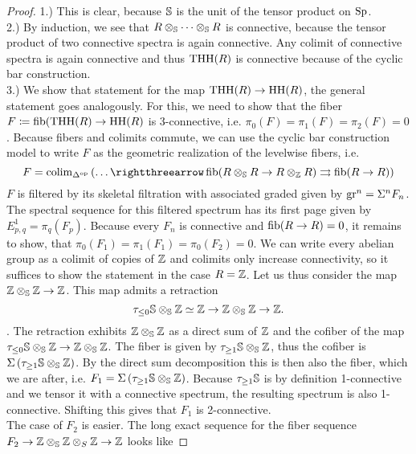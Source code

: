 \begin{proof}
    1.) This is clear, because $\S$ is the unit of the tensor product on $\Sp$. \\
    2.) By induction, we see that $R\otimes_\S\dots\otimes_\S R$ is connective, because the tensor product of two connective spectra is again connective. Any colimit of connective spectra is again connective and thus $\THH(R)$ is connective because of the cyclic bar construction. \\
    3.) We show that statement for the map $\THH(R)\to \HH(R)$, the general statement goes analogously.
    For this, we need to show that the fiber $F\coloneqq \fib(\THH(R)\to \HH(R)$ is 3-connective, i.e. $\pi_0(F)=\pi_1(F)=\pi_2(F)=0$. Because fibers and colimits commute, we can use the cyclic bar construction model to write $F$ as the geometric realization of the levelwise fibers, i.e.
    \begin{equation*}
        F=\colim_{\Delta^{\op}} \left( \dots\rightthreearrow \fib(R\otimes_\S R\to R\otimes_\Z R) \rightrightarrows \fib(R\to R) \right)
    \end{equation*}
    $F$ is filtered by its skeletal filtration with associated graded given by $\gr^n=\Sigma^n F_n$. The spectral sequence for this filtered spectrum has its first page given by $E^1_{p,q}=\pi_q(F_p)$. Because every $F_n$ is connective and $\fib(R\to R)=0$, it remains to show, that $\pi_0(F_1)=\pi_1(F_1)=\pi_0(F_2)=0$. We can write every abelian group as a colimit of copies of $\Z$ and colimits only increase connectivity, so it suffices to show the statement in the case $R=\Z$. Let us thus consider the map $\Z\otimes_\S \Z\to \Z$. This map admits a retraction 
    \begin{equation*}
        \tau_{\leq 0}\S\otimes_\S\Z\simeq \Z\to \Z\otimes_\S \Z\to \Z.
    \end{equation*}.
    The retraction exhibits $\Z\otimes_\S\Z$ as a direct sum of $\Z$ and the cofiber of the map $\tau_{\leq 0}\S\otimes_\S\Z\to \Z\otimes_\S\Z$. The fiber is given by $\tau_{\geq 1}\S\otimes_\S\Z$, thus the cofiber is $\Sigma\left( \tau_{\geq 1}\S\otimes_\S\Z \right)$. By the direct sum decomposition this is then also the fiber, which we are after, i.e. $F_1=\Sigma\left( \tau_{\geq 1}\S\otimes_\S\Z \right)$. Because $\tau_{\geq 1}\S$ is by definition 1-connective and we tensor it with a connective spectrum, the resulting spectrum is also 1-connective. Shifting this gives that $F_1$ is 2-connective. \\
    The case of $F_2$ is easier. The long exact sequence for the fiber sequence $F_2\to \Z\otimes_\S\Z\otimes_S\Z\to \Z$ looks like 

\end{proof}
